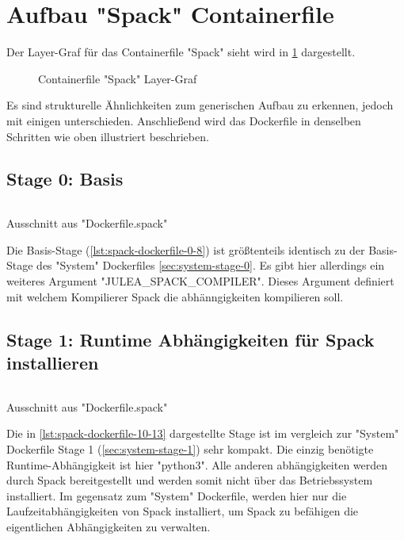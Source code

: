 \pagebreak

\section{Aufbau "Spack" Containerfile}
Der Layer-Graf für das Containerfile "Spack" sieht wird in \cref{fig:spack-layer-graph} dargestellt.
\begin{figure}[!htbp]
    \centering
    
    \caption{Containerfile "Spack" Layer-Graf}
    \label{fig:spack-layer-graph}
\end{figure}

Es sind strukturelle Ähnlichkeiten zum generischen Aufbau zu erkennen, jedoch mit einigen unterschieden. Anschließend wird das Dockerfile in denselben Schritten wie oben illustriert beschrieben.

\subsection{Stage 0: Basis}

\begin{listing}[H]
    \inputminted[firstline=0,lastline=8]{dockerfile}{./code-examples/Dockerfile.spack}
    \caption{Ausschnitt aus "Dockerfile.spack"}
    \label{lst:spack-dockerfile-0-8}
\end{listing}

Die Basis-Stage (\cref{lst:spack-dockerfile-0-8}) ist größtenteils identisch zu der Basis-Stage des "System" Dockerfiles \cref{sec:system-stage-0}. Es gibt hier allerdings ein weiteres Argument "JULEA\_SPACK\_COMPILER". Dieses Argument definiert mit welchem Kompilierer Spack die abhänngigkeiten kompilieren soll. 

\subsection{Stage 1: Runtime Abhängigkeiten für Spack installieren}

\begin{listing}[H]
    \inputminted[firstline=10,lastline=13]{dockerfile}{./code-examples/Dockerfile.spack}
    \caption{Ausschnitt aus "Dockerfile.spack"}
    \label{lst:spack-dockerfile-10-13}
\end{listing}

Die in \cref{lst:spack-dockerfile-10-13} dargestellte Stage ist im vergleich zur "System" Dockerfile Stage 1 (\cref{sec:system-stage-1}) sehr kompakt.
Die einzig benötigte Runtime-Abhängigkeit ist hier "python3". Alle anderen abhängigkeiten werden durch Spack bereitgestellt und werden somit nicht über das Betriebssystem installiert. Im gegensatz zum "System" Dockerfile, werden hier nur die Laufzeitabhängigkeiten von Spack installiert, um Spack zu befähigen die eigentlichen Abhängigkeiten zu verwalten.


